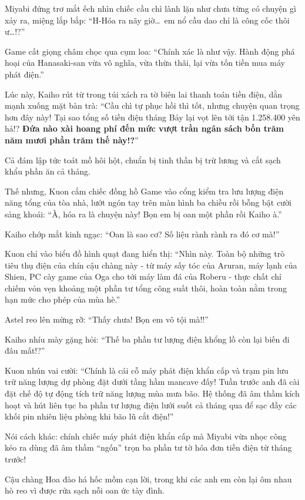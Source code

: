 \documentclass[../main.tex]{subfiles}
\begin{document}
Miyabi đứng trơ mắt ếch nhìn chiếc cầu chì lành lặn như chưa từng có chuyện gì xảy ra, miệng lắp bắp: ``H-Hóa ra nãy giờ\dots\ em nổ cầu dao chỉ là công cốc thôi ư\dots!?''

Game cất giọng châm chọc qua cụm loa: ``Chính xác là như vậy. Hành động phá hoại của Hanasaki-san vừa vô nghĩa, vừa thừa thãi, lại vừa tốn tiền mua máy phát điện.''

Lúc này, Kaiho rút từ trong túi xách ra tờ biên lai thanh toán tiền điện, dằn mạnh xuống mặt bàn trà: ``Cầu chì tự phục hồi thì tốt, nhưng chuyện quan trọng hơn đây này! Tại sao tổng số tiền điện tháng Bảy lại vọt lên tới tận 1.258.400 yên hả!? \textbf{Đứa nào xài hoang phí đến mức vượt trần ngân sách bốn trăm năm mươi phần trăm thế này!?}''

Cả đám lập tức toát mồ hôi hột, chuẩn bị tinh thần bị trừ lương và cắt sạch khẩu phần ăn cả tháng.

Thế nhưng, Kuon cắm chiếc đồng hồ Game vào cổng kiểm tra lưu lượng điện năng tổng của tòa nhà, lướt ngón tay trên màn hình ba chiều rồi bỗng bật cười sảng khoái: ``À, hóa ra là chuyện này! Bọn em bị oan một phần rồi Kaiho à.''

Kaiho chớp mắt kinh ngạc: ``Oan là sao cơ? Số liệu rành rành ra đó cơ mà!''

Kuon chỉ vào biểu đồ hình quạt đang hiển thị: ``Nhìn này. Toàn bộ những trò tiêu thụ điện của chín cậu chàng này - từ máy sấy tóc của Aruran, máy lạnh của Shien, PC cày game của Oga cho tới máy làm đá của Roberu - thực chất chỉ chiếm vỏn vẹn khoảng một phần tư tổng công suất thôi, hoàn toàn nằm trong hạn mức cho phép của mùa hè.''

Astel reo lên mừng rỡ: ``Thấy chưa! Bọn em vô tội mà!!''

Kaiho nhíu mày gặng hỏi: ``Thế ba phần tư lượng điện khổng lồ còn lại biến đi đâu mất!?''

Kuon nhún vai cười: ``Chính là cái cỗ máy phát điện khẩn cấp và trạm pin lưu trữ năng lượng dự phòng đặt dưới tầng hầm mancave đấy! Tuần trước anh đã cài đặt chế độ tự động tích trữ năng lượng mùa mưa bão. Hệ thống đã âm thầm kích hoạt và hút liên tục ba phần tư lượng điện lưới suốt cả tháng qua để sạc đầy các khối pin nhiên liệu phòng khi bão lũ cắt điện!''

Nói cách khác: chính chiếc máy phát điện khẩn cấp mà Miyabi vừa nhọc công kéo ra dùng đã âm thầm ``ngốn'' trọn ba phần tư tờ hóa đơn tiền điện từ tháng trước!

Cậu chàng Hoa đào há hốc mồm cạn lời, trong khi các anh em còn lại ôm nhau hò reo vì được rửa sạch nỗi oan ức tày đình.
\end{document}
